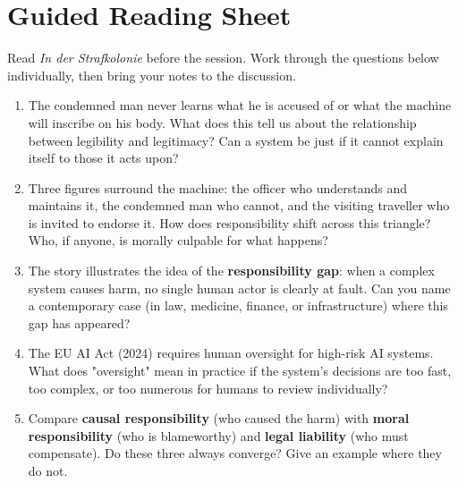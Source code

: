 \vspace{3.5em}

\section*{Guided Reading Sheet}

\noindent Read \textit{In der Strafkolonie} before the session. Work through the
questions below individually, then bring your notes to the discussion.

\begin{enumerate}
    \item The condemned man never learns what he is accused of or what
    the machine will inscribe on his body. What does this tell us about
    the relationship between legibility and legitimacy? Can a system be
    just if it cannot explain itself to those it acts upon?

    \item Three figures surround the machine: the officer who
    understands and maintains it, the condemned man who cannot, and
    the visiting traveller who is invited to endorse it. How does
    responsibility shift across this triangle? Who, if anyone, is
    morally culpable for what happens?

    \item The story illustrates the idea of the \textbf{responsibility
    gap}: when a complex system causes harm, no single human actor is
    clearly at fault. Can you name a contemporary case (in law,
    medicine, finance, or infrastructure) where this gap has appeared?

    \item The EU AI Act (2024) requires human oversight for high-risk
    AI systems. What does "oversight" mean in practice if the system's
    decisions are too fast, too complex, or too numerous for humans to
    review individually?

    \item Compare \textbf{causal responsibility} (who caused the harm)
    with \textbf{moral responsibility} (who is blameworthy) and
    \textbf{legal liability} (who must compensate). Do these three always
    converge? Give an example where they do not.\\
\end{enumerate}

